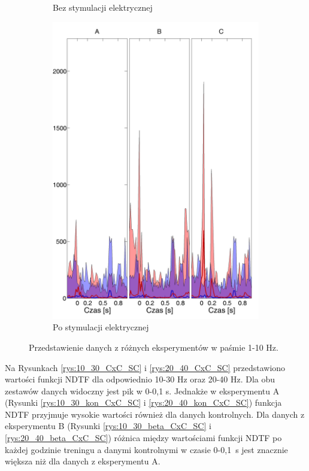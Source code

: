 \documentclass{pracamgr_2}
\begin{document}
\begin{figure}[h]
\begin{subfigure}{.5\textwidth}
			\caption{Bez stymulacji elektrycznej}
			\label{rys:1_10_kon_CxC_SC}
		\end{subfigure}%
		\begin{subfigure}{.5\textwidth}
			\centering
			\includegraphics[width=1.\linewidth]{beta3_1-10_z_CxC5_do_SC42.png}
			\caption{Po stymulacji elektrycznej}
			\label{rys:1_10_beta_CxC_SC}
		\end{subfigure}
		\caption{Przedstawienie danych z różnych eksperymentów w paśmie 1-10 Hz.}
		\label{rys:1_10_CxC_SC}
	\end{figure}
	\FloatBarrier
	Na Rysunkach \ref{rys:10_30_CxC_SC} i \ref{rys:20_40_CxC_SC} przedstawiono wartości funkcji NDTF dla odpowiednio 10-30 Hz oraz 20-40 Hz. Dla obu zestawów danych widoczny jest pik w 0-0,1 s. Jednakże w eksperymentu A (Rysunki \ref{rys:10_30_kon_CxC_SC} i \ref{rys:20_40_kon_CxC_SC}) funkcja NDTF przyjmuje wysokie wartości również dla danych kontrolnych. Dla danych z eksperymentu B (Rysunki \ref{rys:10_30_beta_CxC_SC} i \ref{rys:20_40_beta_CxC_SC}) różnica między wartościami funkcji NDTF po każdej godzinie treningu a danymi kontrolnymi w czasie 0-0,1~s jest znacznie większa niż dla danych z eksperymentu A.
\end{document}
